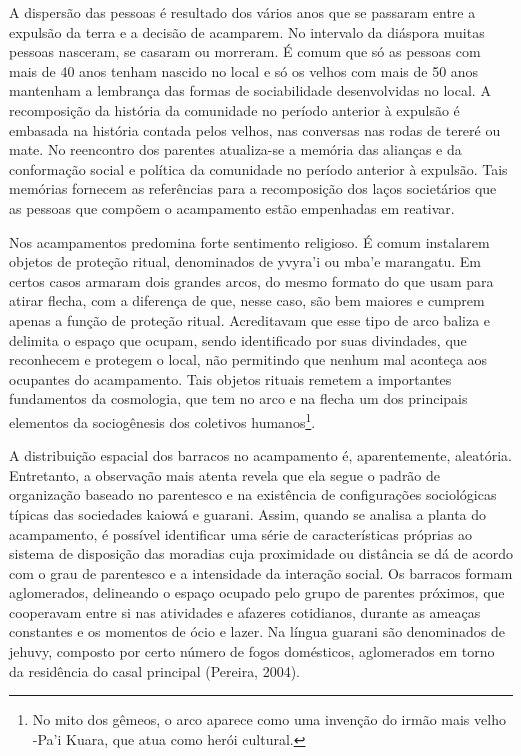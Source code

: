 \documentclass{article}
\begin{document}
A dispers\~ao das pessoas \'e resultado dos v\'arios anos que se
passaram entre a expuls\~ao da terra e a decis\~ao de acamparem. No
intervalo da di\'aspora muitas pessoas nasceram, se casaram ou
morreram. \'E comum que s\'o as pessoas com mais de 40 anos tenham
nascido no local e s\'o os velhos com mais de 50 anos mantenham a
lembran\c{c}a das formas de sociabilidade desenvolvidas no local. A
recomposi\c{c}\~ao da hist\'oria da comunidade no per\'iodo anterior
\`a expuls\~ao \'e embasada na hist\'oria contada pelos velhos, nas
conversas nas rodas de terer\'e ou mate. No reencontro dos parentes
atualiza-se a mem\'oria das alian\c{c}as e da conforma\c{c}\~ao social
e pol\'itica da comunidade no per\'iodo anterior \`a expuls\~ao. Tais
mem\'orias fornecem as refer\^encias para a recomposi\c{c}\~ao dos
la\c{c}os societ\'arios que as pessoas que comp\~oem o acampamento
est\~ao empenhadas em reativar. 

Nos acampamentos predomina forte sentimento religioso. \'E comum
instalarem objetos de prote\c{c}\~ao ritual, denominados de
yvyra{\textquoteright}i ou mba{\textquoteright}e marangatu. Em certos
casos armaram dois grandes arcos, do mesmo formato do que usam para
atirar flecha, com a diferen\c{c}a de que, nesse caso, s\~ao bem
maiores e cumprem apenas a fun\c{c}\~ao de prote\c{c}\~ao ritual.
Acreditavam que esse tipo de arco baliza e delimita o espa\c{c}o que
ocupam, sendo identificado por suas divindades, que reconhecem e
protegem o local, n\~ao permitindo que nenhum mal aconte\c{c}a aos
ocupantes do acampamento. Tais objetos rituais remetem a importantes
fundamentos da cosmologia, que tem no arco e na flecha um dos
principais elementos da sociog\^enesis dos coletivos humanos\footnote{
No mito dos g\^emeos, o arco aparece como uma inven\c{c}\~ao do irm\~ao
mais velho -Pa{\textquoteright}i Kuara, que atua como her\'oi
cultural.}.

A distribui\c{c}\~ao espacial dos barracos no acampamento \'e,
aparentemente, aleat\'oria. Entretanto, a observa\c{c}\~ao mais atenta
revela que ela segue o padr\~ao de organiza\c{c}\~ao baseado no
parentesco e na exist\^encia de configura\c{c}\~oes sociol\'ogicas
t\'ipicas das sociedades kaiow\'a e guarani. Assim, quando se analisa a
planta do acampamento, \'e poss\'ivel identificar uma s\'erie de
caracter\'isticas pr\'oprias ao sistema de disposi\c{c}\~ao das
moradias cuja proximidade ou dist\^ancia se d\'a de acordo com o grau
de parentesco e a intensidade da intera\c{c}\~ao social. Os barracos
formam aglomerados, delineando o espa\c{c}o ocupado pelo grupo de
parentes pr\'oximos, que cooperavam entre si nas atividades e afazeres
cotidianos, durante as amea\c{c}as constantes e os momentos de \'ocio e
lazer. Na l\'ingua guarani s\~ao denominados de jehuvy, composto por
certo n\'umero de fogos dom\'esticos, aglomerados em torno da
resid\^encia do casal principal (Pereira, 2004).
\end{document}
